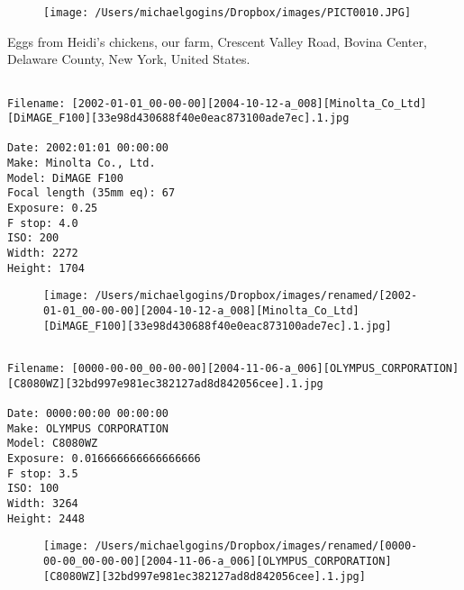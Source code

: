 \documentclass[11pt,letter,DIV=14,paper=landscape]{scrbook}
\begin{document}
\begin{figure}
\texttt{[image: /Users/michaelgogins/Dropbox/images/PICT0010.JPG]}
\end{figure}
    
\clearpage
\noindent Eggs from Heidi's chickens, our farm, Crescent Valley Road, Bovina Center, Delaware County, New York, United States.
\noindent
\begin{lstlisting}

Filename: [2002-01-01_00-00-00][2004-10-12-a_008][Minolta_Co_Ltd][DiMAGE_F100][33e98d430688f40e0eac873100ade7ec].1.jpg

Date: 2002:01:01 00:00:00
Make: Minolta Co., Ltd.
Model: DiMAGE F100
Focal length (35mm eq): 67
Exposure: 0.25
F stop: 4.0
ISO: 200
Width: 2272
Height: 1704
\end{lstlisting}
\clearpage

\begin{figure}
\texttt{[image: /Users/michaelgogins/Dropbox/images/renamed/[2002-01-01\_00-00-00][2004-10-12-a\_008][Minolta\_Co\_Ltd][DiMAGE\_F100][33e98d430688f40e0eac873100ade7ec].1.jpg]}
\end{figure}
    
\clearpage
\noindent 
\noindent
\begin{lstlisting}

Filename: [0000-00-00_00-00-00][2004-11-06-a_006][OLYMPUS_CORPORATION][C8080WZ][32bd997e981ec382127ad8d842056cee].1.jpg

Date: 0000:00:00 00:00:00
Make: OLYMPUS CORPORATION
Model: C8080WZ
Exposure: 0.016666666666666666
F stop: 3.5
ISO: 100
Width: 3264
Height: 2448
\end{lstlisting}
\clearpage

\begin{figure}
\texttt{[image: /Users/michaelgogins/Dropbox/images/renamed/[0000-00-00\_00-00-00][2004-11-06-a\_006][OLYMPUS\_CORPORATION][C8080WZ][32bd997e981ec382127ad8d842056cee].1.jpg]}
\end{figure}
    
\end{document}
